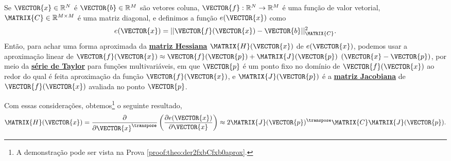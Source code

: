 \begin{theorem}\label{theo:der2fxbCfxb0aprox}
Se 
$\VECTOR{x}\in \mathbb{R}^N$ é  
$\VECTOR{b}\in \mathbb{R}^M$ são vetores coluna,  
$\VECTOR{f}: \mathbb{R}^{N}\rightarrow \mathbb{R}^{M}$ é uma função de valor vetorial,
$\MATRIX{C} \in \mathbb{R}^{M\times M}$ é uma matriz diagonal, e 
definimos a função $e(\VECTOR{x})$ como
\begin{equation}
e(\VECTOR{x})= ||\VECTOR{f}(\VECTOR{x})-\VECTOR{b}||_{\MATRIX{C}}^2.
\end{equation}
Então, para achar uma forma aproximada da \hyperref[def:hessian]{\textbf{matriz Hessiana}} $\MATRIX{H}(\VECTOR{x})$ de $e(\VECTOR{x})$, 
podemos usar a aproximação linear de 
$\VECTOR{f}(\VECTOR{x})\approx \VECTOR{f}(\VECTOR{p}) + \MATRIX{J}(\VECTOR{p})$ $\left(\VECTOR{x}-\VECTOR{p}\right)$, 
por meio da \hyperref[def:taylor]{\textbf{série de Taylor}} 
para funções multivariáveis,
em que $\VECTOR{p}$ é um ponto fixo no domínio de $\VECTOR{f}(\VECTOR{x})$ ao redor do qual é feita  aproximação
da função $\VECTOR{f}(\VECTOR{x})$,
e $\MATRIX{J}(\VECTOR{p})$ é a \hyperref[def:jacobian]{\textbf{matriz Jacobiana}} de $\VECTOR{f}(\VECTOR{x})$ avaliada no ponto $\VECTOR{p}$.

Com essas considerações, obtemos\footnote{A demonstração pode ser vista na Prova \ref{proof:theo:der2fxbCfxb0aprox}.} o seguinte resultado,
\begin{equation}
\MATRIX{H}(\VECTOR{x}) = \frac{\partial}{\partial \VECTOR{x}^{\transpose}}\left(  
\frac{\partial e(\VECTOR{x}) }{\partial \VECTOR{x}} \right) \approx 
2 \MATRIX{J}(\VECTOR{p})^{\transpose}\MATRIX{C} \MATRIX{J}(\VECTOR{p}).
\end{equation}


\end{theorem}
